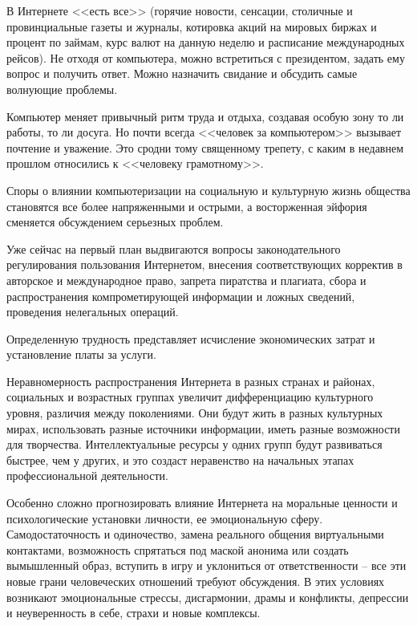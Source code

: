   В Интернете <<есть все>> (горячие новости, сенсации, столичные и
  провинциальные газеты и журналы, котировка акций на мировых биржах и процент
  по займам, курс валют на данную неделю и расписание международных рейсов). Не
  отходя от компьютера, можно встретиться с президентом, задать ему вопрос и
  получить ответ. Можно назначить свидание и обсудить самые волнующие проблемы.
  
  Компьютер меняет привычный ритм труда и отдыха, создавая особую зону то ли
  работы, то ли досуга. Но почти всегда <<человек за компьютером>> вызывает
  почтение и уважение. Это сродни тому священному трепету, с каким в недавнем
  прошлом относились к <<человеку грамотному>>.
  
  Споры о влиянии компьютеризации на социальную и культурную жизнь общества
  становятся все более напряженными и острыми, а восторженная эйфория сменяется
  обсуждением серьезных проблем.
  
  Уже сейчас на первый план выдвигаются вопросы законодательного регулирования
  пользования Интернетом, внесения соответствующих корректив в авторское и
  международное право, запрета пиратства и плагиата, сбора и распространения
  компрометирующей информации и ложных сведений, проведения нелегальных
  операций.
  
  Определенную трудность представляет исчисление экономических затрат и
  установление платы за услуги.
  
  Неравномерность распространения Интернета в разных странах и районах,
  социальных и возрастных группах увеличит дифференциацию культурного уровня,
  различия между поколениями. Они будут жить в разных культурных мирах,
  использовать разные источники информации, иметь разные возможности для
  творчества. Интеллектуальные ресурсы у одних групп будут развиваться быстрее,
  чем у других, и это создаст неравенство на начальных этапах профессиональной
  деятельности.
  
  Особенно сложно прогнозировать влияние Интернета на моральные ценности и
  психологические установки личности, ее эмоциональную сферу. Самодостаточность
  и одиночество, замена реального общения виртуальными контактами, возможность
  спрятаться под маской анонима или создать вымышленный образ, вступить в игру
  и уклониться от ответственности – все эти новые грани человеческих отношений
  требуют обсуждения. В этих условиях возникают эмоциональные стрессы,
  дисгармонии, драмы и конфликты, депрессии и неуверенность в себе, страхи и
  новые комплексы.
  
